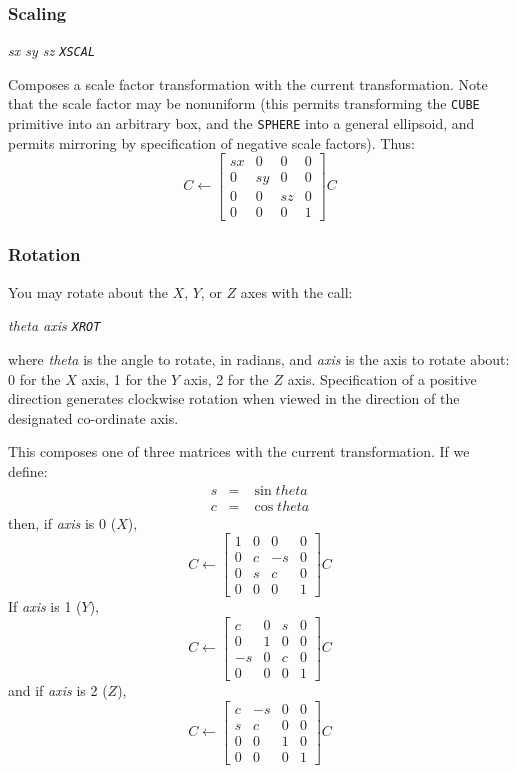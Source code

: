 \documentclass{article}
\begin{document}
\subsubsection{Scaling}

{\em sx sy sz {\tt XSCAL}}

Composes a scale factor transformation with the current transformation.
Note that the scale factor may be nonuniform (this permits
transforming the {\tt CUBE} primitive into an arbitrary box, and the
{\tt SPHERE} into a general ellipsoid, and permits mirroring by
specification of negative scale factors).
Thus:
\[ C \leftarrow \left[ \begin{array}{cccc}
        \mathit{sx} & 0 & 0 & 0 \\
        0 & \mathit{sy} & 0 & 0 \\
        0 & 0 & \mathit{sz} & 0 \\
        0 & 0 & 0 & 1
\end{array} \right] C \]

\subsubsection{Rotation}

You may rotate about the $X$, $Y$, or $Z$ axes with the call:

{\em theta axis {\tt XROT}}

where {\em theta} is the angle to rotate, in radians, and {\em axis}
is the axis to rotate about: 0 for the $X$ axis, 1 for the $Y$ axis, 2
for the $Z$ axis.  Specification of a positive direction generates
clockwise rotation when viewed in the direction of the designated
co-ordinate axis.

This composes one of three matrices with the current transformation.
If we define:
\begin{eqnarray*}
        s & =  &\sin \mathit{theta}\\
        c & =  &\cos \mathit{theta}
\end{eqnarray*}
then, if {\em axis} is 0 ($X$),
\[ C \leftarrow \left[ \begin{array}{cccc}
        1 & 0 & 0 & 0 \\
        0 & c & -s & 0 \\
        0 & s & c & 0 \\
        0 & 0 & 0 & 1
\end{array} \right] C \]
If {\em axis} is 1 ($Y$),
\[ C \leftarrow \left[ \begin{array}{cccc}
        c & 0 & s & 0 \\
        0 & 1 & 0 & 0 \\
        -s & 0 & c & 0 \\
        0 & 0 & 0 & 1
\end{array} \right] C \]
and if {\em axis} is 2 ($Z$),
\[ C \leftarrow \left[ \begin{array}{cccc}
        c & -s & 0 & 0 \\
        s & c & 0 & 0 \\
        0 & 0 & 1 & 0 \\
        0 & 0 & 0 & 1
\end{array} \right] C \]
\end{document}
